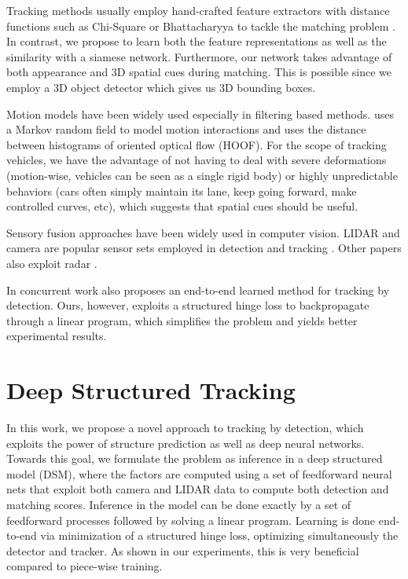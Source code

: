 \documentclass[letterpaper, 10 pt, conference]{ieeeconf}  \pdfminorversion=4
\newcommand{\raquel}[1]{}
\begin{document}
Tracking methods usually employ hand-crafted feature extractors with distance functions such as Chi-Square or Bhattacharyya to tackle the matching problem \cite{mincostflow,onlinecrf,oxfordt,mttonline}. In contrast, we propose to learn both the feature representations as well as the similarity with a siamese network. Furthermore, our network  takes advantage of both appearance and 3D spatial cues during matching. This is possible since we employ a 3D object detector which gives us 3D bounding boxes.

Motion models have been widely used especially in filtering based methods. \cite{motion_pf} uses a Markov random field to model motion interactions and \cite{motion_opt_flow} uses the distance between histograms of oriented optical flow (HOOF). For the scope of tracking vehicles, we have the advantage of not having to deal with severe deformations (motion-wise, vehicles can be seen as a single rigid body) or highly unpredictable behaviors (cars often simply maintain its lane, keep going forward, make controlled curves, etc), which suggests that spatial cues should be useful.

Sensory fusion approaches have been widely used in computer vision. LIDAR and camera are popular sensor sets employed in detection and tracking \cite{sensorfusion1, mv3d, sensorfusion3}. Other papers also exploit radar  \cite{sensorfusion2}.

In concurrent work \cite{deepflow} also proposes an end-to-end learned method for tracking by detection. Ours, however, exploits a structured hinge loss to backpropagate through a linear program, which simplifies the problem and yields better experimental results.
\raquel{I'm concernced about the last sentence. Did we try and compare?} \section{Deep Structured  Tracking}
\label{sec:DSM}

In this work, we propose a novel approach to tracking by detection, which exploits the power of structure prediction as well as deep neural networks. Towards this goal, we formulate the problem as inference in a deep structured model (DSM), where the factors are computed using a set of feedforward neural nets that exploit both camera and LIDAR data to compute both detection and matching scores. Inference in the model can be done exactly by a set of feedforward processes followed by solving a linear program. Learning is done end-to-end via minimization of a structured hinge loss, optimizing simultaneously the detector and tracker. As shown in our experiments, this is very beneficial compared to piece-wise training.
\end{document}
